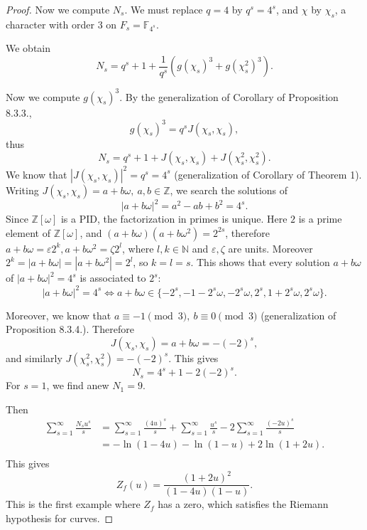 \documentclass[11pt,a4paper]{article}
\newcommand{\Z}{\mathbb{Z}}
\newcommand{\N}{\mathbb{N}}
\newcommand{\F}{\mathbb{F}}
\begin{document}
\begin{proof}
Now we compute $N_s$. We must replace $q =4$ by $q^s = 4^s$, and $\chi$ by $\chi_s$, a character with order 3 on $F_s = \F_{4^s}$.

We obtain
$$N_s = q^s + 1 + \frac{1}{q^s} \left (g(\chi_s)^3 + g(\chi_s^2)^3 \right).$$

Now we compute $g(\chi_s)^3$. By the generalization of Corollary of Proposition 8.3.3., 
$$g(\chi_s)^3 = q^s J(\chi_s,\chi_s),$$
thus
$$N_s = q^s + 1 +  J(\chi_s,\chi_s) + J(\chi_s^2,\chi_s^2) .
$$
We know that $|J(\chi_s,\chi_s)|^2 = q^s = 4^s$ (generalization of Corollary of Theorem 1). Writing $J(\chi_s,\chi_s) = a+ b \omega,\ a,b\in \Z$, we search the solutions of
$$|a+ b \omega|^2 = a^2 - ab + b^2 = 4^s.$$
Since $\Z[\omega]$ is a PID, the factorization in primes is unique. Here $2$ is a prime element of $\Z[\omega]$, and $(a+b \omega)(a+b \omega^2) = 2^{2s}$, therefore $a+b \omega =\varepsilon 2^k, a+b \omega^2 = \zeta 2^l$, where $l,k \in \N$ and $\varepsilon, \zeta$ are units. Moreover $2^k = |a+ b \omega| = |a+b \omega^2| = 2^l$, so $k = l = s$. This shows that every solution $a+ b \omega$ of $|a+ b \omega|^2  =4^s$ is associated to $2^s$:
$$|a+ b \omega|^2  =4^s \iff a+b \omega \in \{-2^s, -1 - 2^s \omega, -2^s \omega, 2^s, 1 + 2^s \omega, 2^s \omega\}.$$

Moreover, we know that $a \equiv -1 \pmod 3,\ b \equiv 0 \pmod 3$ (generalization of Proposition 8.3.4.). Therefore $$J(\chi_s,\chi_s) = a + b \omega = -(-2)^s,$$
and similarly $J(\chi_s^2,\chi_s^2) = -(-2)^s$.  This gives
$$N_s = 4^s + 1 -2 (-2)^{s}.$$
For $s = 1$, we find anew $N_1 = 9$.

Then 
\begin{align*}
\sum_{s=1}^\infty \frac{N_s u^s}{s} &= \sum_{s=1}^\infty \frac{(4u)^s}{s}  + \sum_{s=1}^\infty \frac{u^s}{s} - 2 \sum_{s=1}^\infty \frac{(-2u)^s}{s}\\
&= - \ln(1-4u) - \ln(1-u) + 2 \ln(1+2u).\\
\end{align*}
This gives
$$Z_f(u) = \frac{(1+2u)^2}{(1-4u)(1-u)}.$$
This is the first example where $Z_f$ has a zero, which satisfies the Riemann hypothesis for curves.
\end{proof}
\end{document}
